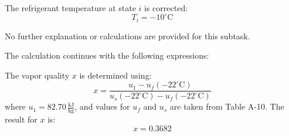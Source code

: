 The refrigerant temperature at state \(i\) is corrected:  
\[
T_i = -10^\circ\text{C}
\]  

No further explanation or calculations are provided for this subtask.

The calculation continues with the following expressions:  

The vapor quality \( x \) is determined using:  
\[
x = \frac{u_1 - u_f(-22^\circ \text{C})}{u_s(-22^\circ \text{C}) - u_f(-22^\circ \text{C})}
\]  
where \( u_1 = 82.70 \, \frac{\text{kJ}}{\text{kg}} \), and values for \( u_f \) and \( u_s \) are taken from Table A-10. The result for \( x \) is:  
\[
x = 0.3682
\]